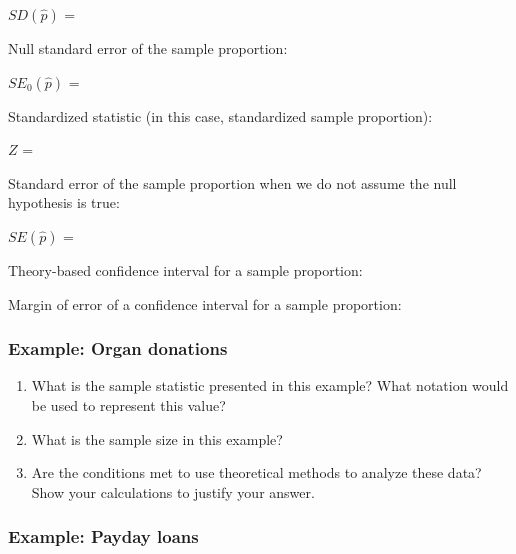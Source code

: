 \documentclass[
]{report}
\newcommand{\rgs}{\vspace{12pt}} %
\begin{document}
\(SD(\hat{p})\) =
\rgs

Null standard error of the sample proportion:

\(SE_0(\hat{p})\) =
\rgs

Standardized statistic (in this case, standardized sample proportion):

\(Z\) =
\rgs

Standard error of the sample proportion when we do not assume the null hypothesis is true:

\(SE(\hat{p})\) =
\rgs

Theory-based confidence interval for a sample proportion:
\rgs

Margin of error of a confidence interval for a sample proportion:
\rgs

\hypertarget{example-organ-donations-1}{%
\subsubsection*{Example: Organ donations}\label{example-organ-donations-1}}

\begin{enumerate}
\def\labelenumi{\arabic{enumi}.}
\item
  What is the sample statistic presented in this example? What notation would be used to represent this value?
  \rgs
\item
  What is the sample size in this example?
  \rgs
\item
  Are the conditions met to use theoretical methods to analyze these data? Show your calculations to justify your answer.
  \rgs
  \rgs
\end{enumerate}

\hypertarget{example-payday-loans}{%
\subsubsection*{Example: Payday loans}\label{example-payday-loans}}
\end{document}
